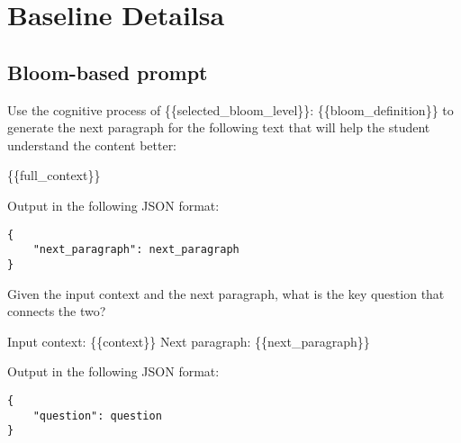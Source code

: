 \section{Baseline Detailsa}
\subsection{Bloom-based prompt}
\label{appdx:bloom-based-prompting}

\begin{tcolorbox}[title=Generating Next Paragraph, myboxstyle, breakable]

Use the cognitive process of \{\{selected\_bloom\_level\}\}: \{\{bloom\_definition\}\} to generate the next paragraph for the following text that will help the student understand the content better:

\{\{full\_context\}\}

Output in the following JSON format:
\begin{verbatim}
{
    "next_paragraph": next_paragraph
}
\end{verbatim}

\end{tcolorbox}

\begin{tcolorbox}[title=Generating Question, myboxstyle, breakable]

Given the input context and the next paragraph, what is the key question that connects the two?

Input context: \{\{context\}\}  
Next paragraph: \{\{next\_paragraph\}\}  

Output in the following JSON format:
\begin{verbatim}
{
    "question": question
}
\end{verbatim}

\end{tcolorbox}



